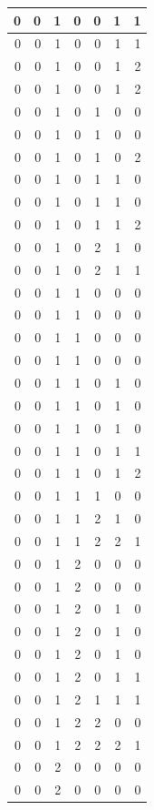 \documentclass[
  12pt,
]{krantz}
\begin{document}
\begin{tabular}{r|r|r|r|r|r|r}
\hline
0 & 0 & 1 & 0 & 0 & 1 & 1\\
\hline
0 & 0 & 1 & 0 & 0 & 1 & 1\\
\hline
0 & 0 & 1 & 0 & 0 & 1 & 2\\
\hline
0 & 0 & 1 & 0 & 0 & 1 & 2\\
\hline
0 & 0 & 1 & 0 & 1 & 0 & 0\\
\hline
0 & 0 & 1 & 0 & 1 & 0 & 0\\
\hline
0 & 0 & 1 & 0 & 1 & 0 & 2\\
\hline
0 & 0 & 1 & 0 & 1 & 1 & 0\\
\hline
0 & 0 & 1 & 0 & 1 & 1 & 0\\
\hline
0 & 0 & 1 & 0 & 1 & 1 & 2\\
\hline
0 & 0 & 1 & 0 & 2 & 1 & 0\\
\hline
0 & 0 & 1 & 0 & 2 & 1 & 1\\
\hline
0 & 0 & 1 & 1 & 0 & 0 & 0\\
\hline
0 & 0 & 1 & 1 & 0 & 0 & 0\\
\hline
0 & 0 & 1 & 1 & 0 & 0 & 0\\
\hline
0 & 0 & 1 & 1 & 0 & 0 & 0\\
\hline
0 & 0 & 1 & 1 & 0 & 1 & 0\\
\hline
0 & 0 & 1 & 1 & 0 & 1 & 0\\
\hline
0 & 0 & 1 & 1 & 0 & 1 & 0\\
\hline
0 & 0 & 1 & 1 & 0 & 1 & 1\\
\hline
0 & 0 & 1 & 1 & 0 & 1 & 2\\
\hline
0 & 0 & 1 & 1 & 1 & 0 & 0\\
\hline
0 & 0 & 1 & 1 & 2 & 1 & 0\\
\hline
0 & 0 & 1 & 1 & 2 & 2 & 1\\
\hline
0 & 0 & 1 & 2 & 0 & 0 & 0\\
\hline
0 & 0 & 1 & 2 & 0 & 0 & 0\\
\hline
0 & 0 & 1 & 2 & 0 & 1 & 0\\
\hline
0 & 0 & 1 & 2 & 0 & 1 & 0\\
\hline
0 & 0 & 1 & 2 & 0 & 1 & 0\\
\hline
0 & 0 & 1 & 2 & 0 & 1 & 1\\
\hline
0 & 0 & 1 & 2 & 1 & 1 & 1\\
\hline
0 & 0 & 1 & 2 & 2 & 0 & 0\\
\hline
0 & 0 & 1 & 2 & 2 & 2 & 1\\
\hline
0 & 0 & 2 & 0 & 0 & 0 & 0\\
\hline
0 & 0 & 2 & 0 & 0 & 0 & 0\\

\end{tabular}
\end{document}
